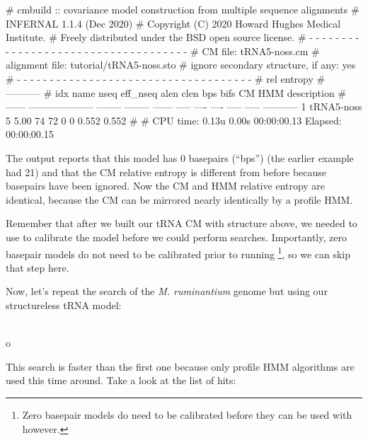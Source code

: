 \begin{sreoutput}
# cmbuild :: covariance model construction from multiple sequence alignments
# INFERNAL 1.1.4 (Dec 2020)
# Copyright (C) 2020 Howard Hughes Medical Institute.
# Freely distributed under the BSD open source license.
# - - - - - - - - - - - - - - - - - - - - - - - - - - - - - - - - - - - -
# CM file:                                            tRNA5-noss.cm
# alignment file:                                     tutorial/tRNA5-noss.sto
# ignore secondary structure, if any:                 yes
# - - - - - - - - - - - - - - - - - - - - - - - - - - - - - - - - - - - -
#                                                                      rel entropy
#                                                                      -----------
# idx    name                     nseq eff_nseq   alen  clen  bps bifs    CM   HMM description
# ------ -------------------- -------- -------- ------ ----- ---- ---- ----- ----- -----------
       1 tRNA5-noss                  5     5.00     74    72    0    0 0.552 0.552 
#
# CPU time: 0.13u 0.00s 00:00:00.13 Elapsed: 00:00:00.15
\end{sreoutput}

The output reports that this model has 0 basepairs (``bps'') (the
earlier example had 21) and that the CM relative entropy is different
from before because basepairs have been ignored. Now the CM and HMM 
relative entropy are identical, because the CM can be mirrored nearly
identically by a profile HMM.

Remember that after we built our tRNA CM with structure above, we
needed to use  to calibrate the model before we
could perform searches. Importantly, zero basepair models do not need
to be calibrated prior to running \footnote{Zero
  basepair models do need to be calibrated before they can be used
  with  however.}, so we can skip that step here. 

Now, let's repeat the search of the \emph{M. ruminantium} genome but
using our structureless tRNA model: 

\\o

This search is faster than the first one because only profile HMM
algorithms are used this time around. Take a look at the list of hits:

\newpage

